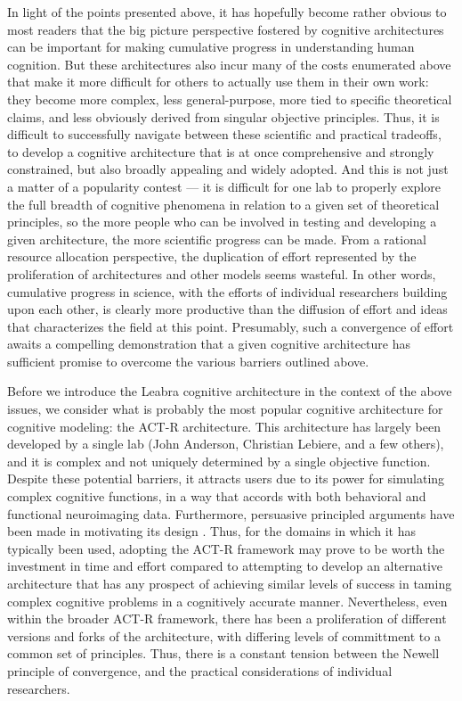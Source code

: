 \documentclass[11pt,twoside]{article}
\begin{document}
In light of the points presented above, it has hopefully become rather
obvious to most readers that the big picture perspective fostered by
cognitive architectures can be important for making cumulative
progress in understanding human cognition.  But these architectures
also incur many of the costs enumerated above that make it more
difficult for others to actually use them in their own work: they
become more complex, less general-purpose, more tied to specific
theoretical claims, and less obviously derived from singular objective
principles.  Thus, it is difficult to successfully navigate between
these scientific and practical tradeoffs, to develop a cognitive
architecture that is at once comprehensive and strongly constrained,
but also broadly appealing and widely adopted.  And this is not just a
matter of a popularity contest --- it is difficult for one lab to
properly explore the full breadth of cognitive phenomena in relation
to a given set of theoretical principles, so the more people who can
be involved in testing and developing a given architecture, the more
scientific progress can be made.  From a rational resource allocation
perspective, the duplication of effort represented by the
proliferation of architectures and other models seems wasteful.  In
other words, cumulative progress in science, with the efforts of
individual researchers building upon each other, is clearly more
productive than the diffusion of effort and ideas that characterizes
the field at this point.  Presumably, such a convergence of effort
awaits a compelling demonstration that a given cognitive architecture
has sufficient promise to overcome the various barriers outlined
above.

Before we introduce the Leabra cognitive architecture in the context
of the above issues, we consider what is probably the most popular
cognitive architecture for cognitive modeling: the ACT-R architecture.
This architecture has largely been developed by a single lab (John
Anderson, Christian Lebiere, and a few others), and it is complex and
not uniquely determined by a single objective function.  Despite these
potential barriers, it attracts users due to its power for simulating
complex cognitive functions, in a way that accords with both
behavioral and functional neuroimaging data.  Furthermore, persuasive
principled arguments have been made in motivating its design
\cite{Anderson83,Anderson90,Anderson93,AndersonBothellByrneEtAl04}.
Thus, for the domains in which it has typically been used, adopting
the ACT-R framework may prove to be worth the investment in time and
effort compared to attempting to develop an alternative architecture
that has any prospect of achieving similar levels of success in taming
complex cognitive problems in a cognitively accurate manner.
Nevertheless, even within the broader ACT-R framework, there has been
a proliferation of different versions and forks of the architecture,
with differing levels of committment to a common set of principles.
Thus, there is a constant tension between the Newell principle of
convergence, and the practical considerations of individual
researchers.
\end{document}
